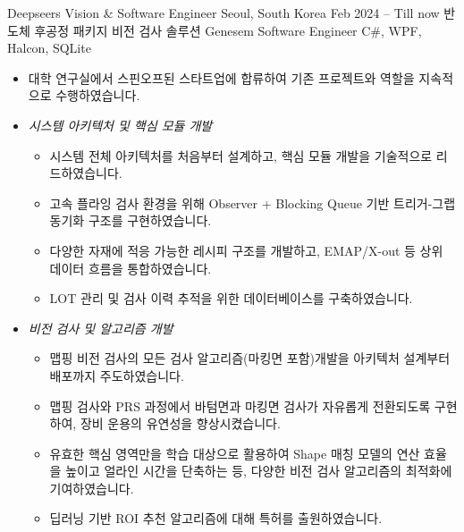 \documentclass[10pt, a4paper]{cvhari}
\begin{document}

    \company
        {Deepseers}
        {Vision \& Software Engineer}
        {Seoul, South Korea}
        {Feb 2024 -- Till now}
    \project
        {반도체 후공정 패키지 비전 검사 솔루션}
        {Genesem}
        {Software Engineer}
        {C\#, WPF, Halcon, SQLite}
    
    \begin{itemize}
        \item 대학 연구실에서 스핀오프된 스타트업에 합류하여 기존 프로젝트와 역할을 지속적으로 수행하였습니다.
    \end{itemize}
    \vspace{1mm}
    \begin{itemize}
        \item \textsl{시스템 아키텍처 및 핵심 모듈 개발}
        \begin{itemize}
            \item 시스템 전체 아키텍처를 처음부터 설계하고, 핵심 모듈 개발을 기술적으로 리드하였습니다.
            \item 고속 플라잉 검사 환경을 위해 Observer + Blocking Queue 기반 트리거-그랩 동기화 구조를 구현하였습니다.
            \item 다양한 자재에 적응 가능한 레시피 구조를 개발하고, EMAP/X-out 등 상위 데이터 흐름을 통합하였습니다.
            \item LOT 관리 및 검사 이력 추적을 위한 데이터베이스를 구축하였습니다.
        \end{itemize}
    \end{itemize}
    \begin{itemize}
        \item \textsl{비전 검사 및 알고리즘 개발}
        \begin{itemize}
            \item 맵핑 비전 검사의 모든 검사 알고리즘(마킹면 포함)개발을 아키텍처 설계부터 배포까지 주도하였습니다.
            \item 맵핑 검사와 PRS 과정에서 바텀면과 마킹면 검사가 자유롭게 전환되도록 구현하여, 장비 운용의 유연성을 향상시켰습니다.
            \item 유효한 핵심 영역만을 학습 대상으로 활용하여 Shape 매칭 모델의 연산 효율을 높이고 얼라인 시간을 단축하는 등, 다양한 비전 검사 알고리즘의 최적화에 기여하였습니다.
            \item 딥러닝 기반 ROI 추천 알고리즘에 대해 특허를 출원하였습니다.
        \end{itemize}
    \end{itemize}
\end{document}
